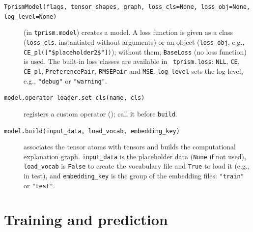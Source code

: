 \documentclass[a4paper]{report}
\begin{document}
\begin{description}
	\item[{\tt TprismModel(flags, tensor\_shapes, graph, loss\_cls=None, loss\_obj=None, log\_level=None)}] (in {\tt tprism.model})
	creates a model.  A loss function is given as a class ({\tt loss\_cls},
	instantiated without arguments) or an object ({\tt loss\_obj}, e.g., {\tt
		CE\_pl(["\$placeholder2\$"])}); without them, {\tt BaseLoss} (no loss
	function) is used.  The built-in loss classes are available in {\tt
		tprism.loss}: {\tt NLL}, {\tt CE}, {\tt CE\_pl}, {\tt PreferencePair},
	{\tt RMSEPair} and {\tt MSE}.  {\tt log\_level} sets the log level, e.g.,
	{\tt "debug"} or {\tt "warning"}.
	\item[{\tt model.operator\_loader.set\_cls(name, cls)}]
	registers a custom operator (); call it before {\tt build}.
	\item[{\tt model.build(input\_data, load\_vocab, embedding\_key)}]
	associates the tensor atoms with tensors and builds the computational
	explanation graph.  {\tt input\_data} is the placeholder data ({\tt None}
	if not used), {\tt load\_vocab} is {\tt False} to create the vocabulary
	file and {\tt True} to load it (e.g., in test), and {\tt embedding\_key}
	is the group of the embedding files: {\tt "train"} or {\tt "test"}.
\end{description}

\section{Training and prediction}
\label{sec:api_train}
\end{document}
